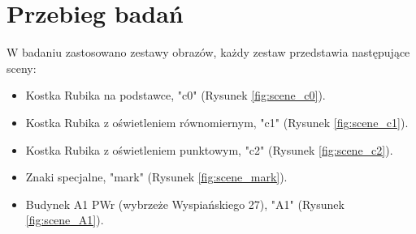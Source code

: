 \graphicspath{ {./img/data/} }

\chapter{Przebieg badań}

W badaniu zastosowano zestawy obrazów, każdy zestaw przedstawia następujące sceny:
\begin{itemize}
   \item Kostka Rubika na podstawce, "c0" (Rysunek \ref{fig:scene_c0}).
   \item Kostka Rubika z oświetleniem równomiernym, "c1" (Rysunek \ref{fig:scene_c1}).
   \item Kostka Rubika z oświetleniem punktowym, "c2" (Rysunek \ref{fig:scene_c2}).
   \item Znaki specjalne, "mark" (Rysunek \ref{fig:scene_mark}).
   \item Budynek A1 PWr (wybrzeże Wyspiańskiego 27), "A1" (Rysunek \ref{fig:scene_A1}).
\end{itemize}

